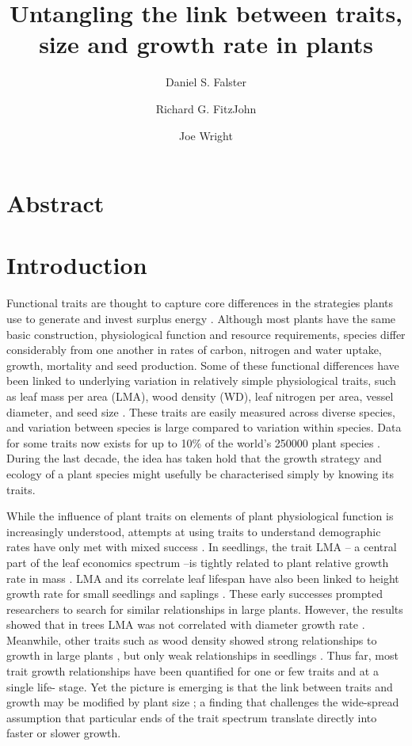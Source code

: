 \documentclass[12pt, a4paper]{article}
\title{\LARGE Untangling the link between traits, size and growth rate in plants}
\author[1]{Daniel S. Falster}
\author[1]{Richard G. FitzJohn}
\author[2]{Joe Wright}
\affil[1]{{\footnotesize Biological Sciences, Macquarie University, North Ryde, NSW 2109, Australia}}
\affil[2]{{\footnotesize Center for Tropical Forest Science, Smithsonian Tropical Research Institute, Panama, Republic of Panama}}
\date{\vspace{-3em}}
\begin{document}
\maketitle
\thispagestyle{empty} %

\section*{Abstract}\label{abstract}

\section*{Introduction}\label{introduction}

Functional traits are thought to capture core differences in the strategies
plants use to generate and invest surplus energy
\citep{wright_world-2004, chave-2009, westoby-2002}.
Although most plants have the same basic construction, physiological function
and resource requirements, species differ considerably from one another in
rates of carbon, nitrogen and water uptake, growth, mortality and seed
production. Some of these functional differences have been linked to
underlying variation in relatively simple physiological traits, such as leaf
mass per area (LMA), wood density (WD), leaf nitrogen per area, vessel
diameter,  and seed size  \citep{wright_world-2004,chave-2009}.
These traits are easily measured across diverse species, and variation between
species is large compared to variation within species. Data for some traits
now exists for up to 10\% of the world's 250000 plant species
\citep{cornwell-2014}. During the last decade, the idea has taken
hold that the growth strategy and ecology of a plant species might usefully be
characterised simply by knowing its traits.

While the influence of plant traits on elements of plant physiological
function is increasingly understood, attempts at using traits to understand
demographic rates have only met with mixed success
\citep{wright-2010, poorter-2008}. In seedlings, the trait LMA
-- a central part of the leaf economics spectrum
\citep{wright_world-2004} --is tightly related to plant relative growth
rate in mass \citep{lambers-1992, wright_cross-2000}. LMA and
its correlate leaf lifespan have also been linked to height growth rate for
small seedlings and saplings \citep{reich-1992, poorter-2006}. These
early successes prompted researchers to search for similar relationships in
large plants. However, the results showed that in trees LMA was not correlated
with diameter growth rate  \citep{wright-2010, poorter-2008,
herault-2011}. Meanwhile, other traits such as wood density showed
strong relationships to growth in large plants \citep{wright-2010},
but only weak relationships in seedlings  \citep{castro-diez-1998}. Thus
far, most trait growth relationships have been quantified for one or few
traits and at a single life- stage. Yet the picture is emerging is that the
link between traits and growth may be modified by plant size
\citep{ruger-2012}; a finding that challenges the wide-spread
assumption that particular ends of the trait spectrum translate directly into
faster or slower growth.
\end{document}

